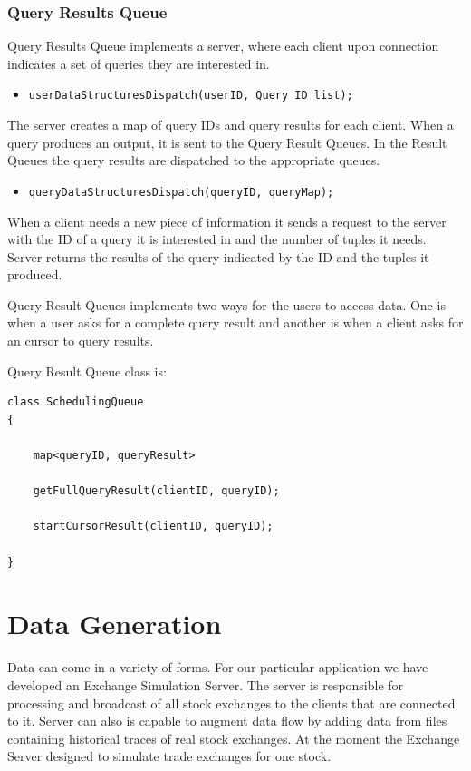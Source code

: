 \documentclass[11pt]{article}
\begin{document}
\subsubsection{Query Results Queue}

Query Results Queue implements a server, where each client upon connection indicates a set of queries they are interested in.

\begin{itemize}
	\item {\tt userDataStructuresDispatch(userID, Query ID list);}
\end{itemize}

\noindent The server creates a map of query IDs and query results for each client. When a query produces an output, it is sent to the Query Result Queues. In the Result Queues the query results are dispatched to the appropriate queues.

\begin{itemize}
	\item {\tt queryDataStructuresDispatch(queryID, queryMap);}
\end{itemize}

\noindent When a client needs a new piece of information it sends a request to the server with the ID of a query it is interested in and the number of tuples it needs. Server returns the results of the query indicated by the ID and the tuples it produced. 

Query Result Queues implements two ways for the users to access data. One is when a user asks for a complete query result and another is when a client asks for an cursor to query results.

Query Result Queue class is:

\begin{verbatim}
class SchedulingQueue
{
    
	map<queryID, queryResult>
	
	getFullQueryResult(clientID, queryID);
	
	startCursorResult(clientID, queryID);
	
}
\end{verbatim}




\section{Data Generation}

Data can come in a variety of forms. For our particular application we have developed an Exchange Simulation Server. The server is responsible for processing and broadcast of all stock exchanges to the clients that are connected to it. Server can also is capable to augment data flow by adding data from files containing historical traces of real stock exchanges. At the moment the Exchange Server designed to simulate trade exchanges for one stock.   
\end{document}
